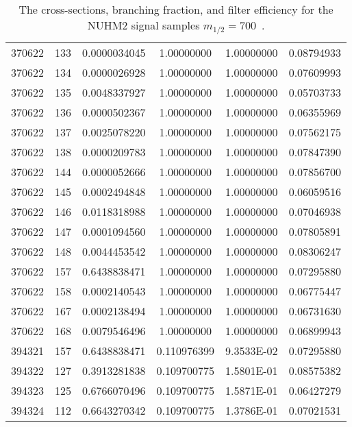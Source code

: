 \begin{table}[htp]
{{\begin{tabular}{cccccc}
                370622 & 133         & 0.0000034045         & 1.00000000  & 1.00000000        & 0.08794933\\
                370622 & 134         & 0.0000026928         & 1.00000000  & 1.00000000        & 0.07609993\\
                370622 & 135         & 0.0048337927         & 1.00000000  & 1.00000000        & 0.05703733\\
                370622 & 136         & 0.0000502367         & 1.00000000  & 1.00000000        & 0.06355969\\
                370622 & 137         & 0.0025078220         & 1.00000000  & 1.00000000        & 0.07562175\\
                370622 & 138         & 0.0000209783         & 1.00000000  & 1.00000000        & 0.07847390\\
                370622 & 144         & 0.0000052666         & 1.00000000  & 1.00000000        & 0.07856700\\
                370622 & 145         & 0.0002494848         & 1.00000000  & 1.00000000        & 0.06059516\\
                370622 & 146         & 0.0118318988         & 1.00000000  & 1.00000000        & 0.07046938\\
                370622 & 147         & 0.0001094560         & 1.00000000  & 1.00000000        & 0.07805891\\
                370622 & 148         & 0.0044453542         & 1.00000000  & 1.00000000        & 0.08306247\\
                370622 & 157         & 0.6438838471         & 1.00000000  & 1.00000000        & 0.07295880\\
                370622 & 158         & 0.0002140543         & 1.00000000  & 1.00000000        & 0.06775447\\
                370622 & 167         & 0.0002138494         & 1.00000000  & 1.00000000        & 0.06731630\\
                370622 & 168         & 0.0079546496         & 1.00000000  & 1.00000000        & 0.06899943\\
                394321 & 157         & 0.6438838471         & 0.110976399 & 9.3533E-02        & 0.07295880\\
                394322 & 127         & 0.3913281838         & 0.109700775 & 1.5801E-01        & 0.08575382\\
                394323 & 125         & 0.6766070496         & 0.109700775 & 1.5871E-01        & 0.06427279\\
                394324 & 112         & 0.6643270342         & 0.109700775 & 1.3786E-01        & 0.07021531\\
                \hline
                \hline
            \end{tabular}
        }
    }
    \caption{The cross-sections, branching fraction, and filter efficiency for the NUHM2 signal samples $m_{1/2} = 700$~{\GeV}.}
    \label{tab:app_xsec_m12_700}
\end{table}%


